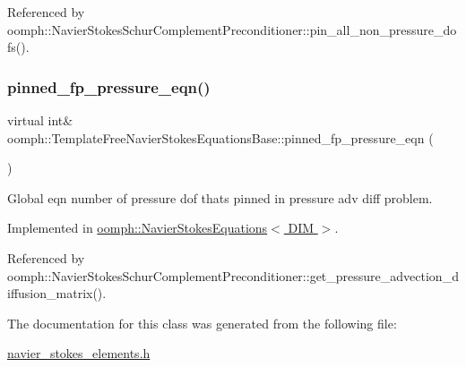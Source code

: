 Referenced by oomph\+::\+Navier\+Stokes\+Schur\+Complement\+Preconditioner\+::pin\+\_\+all\+\_\+non\+\_\+pressure\+\_\+dofs().

\mbox{\label{classoomph_1_1TemplateFreeNavierStokesEquationsBase_a7b4c21107580d63e358ae7469f04399c}} 
\subsubsection{\texorpdfstring{pinned\+\_\+fp\+\_\+pressure\+\_\+eqn()}{pinned\_fp\_pressure\_eqn()}}
{\footnotesize\ttfamily virtual int\& oomph\+::\+Template\+Free\+Navier\+Stokes\+Equations\+Base\+::pinned\+\_\+fp\+\_\+pressure\+\_\+eqn (\begin{DoxyParamCaption}{ }\end{DoxyParamCaption})\hspace{0.3cm}{\ttfamily [pure virtual]}}



Global eqn number of pressure dof that\textquotesingle{}s pinned in pressure adv diff problem. 



Implemented in \hyperlink{classoomph_1_1NavierStokesEquations_aa013a7e3d96ca1f1db6817298222650e}{oomph\+::\+Navier\+Stokes\+Equations$<$ D\+I\+M $>$}.



Referenced by oomph\+::\+Navier\+Stokes\+Schur\+Complement\+Preconditioner\+::get\+\_\+pressure\+\_\+advection\+\_\+diffusion\+\_\+matrix().



The documentation for this class was generated from the following file\+:\begin{DoxyCompactItemize}
\item 
\hyperlink{navier__stokes__elements_8h}{navier\+\_\+stokes\+\_\+elements.\+h}\end{DoxyCompactItemize}
